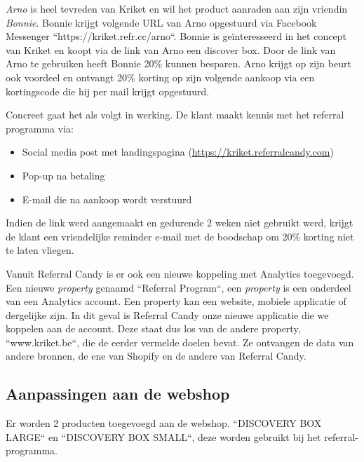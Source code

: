\emph{Arno} is heel tevreden van Kriket en wil het product aanraden aan zijn vriendin \emph{Bonnie}. Bonnie krijgt volgende URL van Arno opgestuurd via Facebook Messenger ``https://kriket.refr.cc/arno``. Bonnie is geïnteresseerd in het concept van Kriket en koopt via de link van Arno een discover box. Door de link van Arno te gebruiken heeft Bonnie 20\% kunnen besparen. Arno krijgt op zijn beurt ook voordeel en ontvangt 20\% korting op zijn volgende aankoop via een kortingscode die hij per mail krijgt opgestuurd.

Concreet gaat het als volgt in werking. De klant maakt kennis met het referral programma via:
\begin{itemize}
	\item Social media post met landingspagina (\href{https://kriket.referralcandy.com}{https://kriket.referralcandy.com})
	\item Pop-up na betaling
	\item E-mail die na aankoop wordt verstuurd
\end{itemize}
Indien de link werd aangemaakt en gedurende 2 weken niet gebruikt werd, krijgt de klant een vriendelijke reminder e-mail met de boodschap om 20\% korting niet te laten vliegen.

Vanuit Referral Candy is er ook een nieuwe koppeling met Analytics toegevoegd. Een nieuwe \emph{property} genaamd ``Referral Program``, een \emph{property} is een onderdeel van een Analytics account. Een property kan een website, mobiele applicatie of dergelijke zijn. In dit geval is Referral Candy onze nieuwe applicatie die we koppelen aan de account. Deze staat dus los van de andere property, ``www.kriket.be``, die de eerder vermelde doelen bevat. Ze ontvangen de data van andere bronnen, de ene van Shopify en de andere van Referral Candy.

\subsection{Aanpassingen aan de webshop} \label{sec:aanpassingen-webshop}
Er worden 2 producten toegevoegd aan de webshop. ``DISCOVERY BOX LARGE`` en ``DISCOVERY BOX SMALL``, deze worden gebruikt bij het referral-programma.


